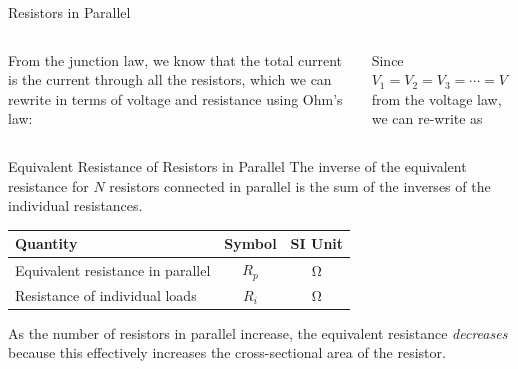 \documentclass[12pt,aspectratio=169]{beamer}
\begin{document}
\begin{frame}{Resistors in Parallel}
  \begin{columns}
    
    From the junction law, we know that the total current is the
    current through all the resistors, which we can rewrite in terms of voltage
    and resistance using Ohm's law:


    Since $V_1=V_2=V_3=\cdots=V$ from the voltage law, we can re-write as

  \end{columns}
\end{frame}



\begin{frame}{Equivalent Resistance of Resistors in Parallel} 
  The inverse of the equivalent resistance for $N$ resistors connected in
  parallel is the sum of the inverses of the individual resistances.

  \begin{center}
    \begin{tabular}{l|c|c}
      \rowcolor{pink}
      \textbf{Quantity} & \textbf{Symbol} & \textbf{SI Unit} \\ \hline
      Equivalent resistance in parallel & $R_p$ & \si\ohm \\
      Resistance of individual loads    & $R_i$ & \si\ohm
    \end{tabular}
  \end{center}
  As the number of resistors in parallel increase, the equivalent resistance
  \emph{decreases} because this effectively increases the cross-sectional
  area of the resistor.
\end{frame}
\end{document}
